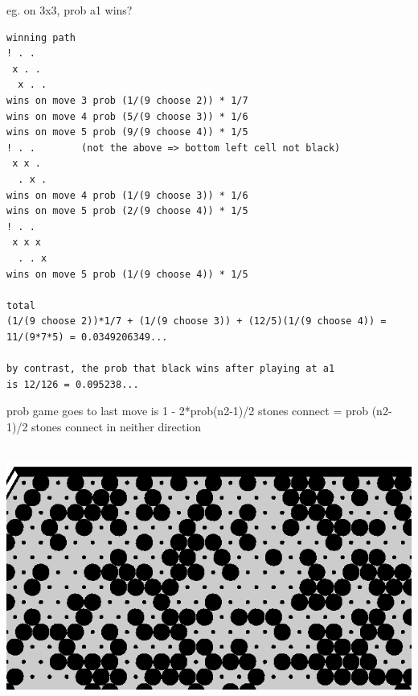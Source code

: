 \documentclass[12pt]{article}
\begin{document}
eg. on 3x3, prob a1 wins?
\begin{verbatim}
winning path
! . .        
 x . .
  x . .
wins on move 3 prob (1/(9 choose 2)) * 1/7
wins on move 4 prob (5/(9 choose 3)) * 1/6
wins on move 5 prob (9/(9 choose 4)) * 1/5
! . .        (not the above => bottom left cell not black)
 x x .
  . x .
wins on move 4 prob (1/(9 choose 3)) * 1/6
wins on move 5 prob (2/(9 choose 4)) * 1/5
! . .        
 x x x
  . . x
wins on move 5 prob (1/(9 choose 4)) * 1/5

total
(1/(9 choose 2))*1/7 + (1/(9 choose 3)) + (12/5)(1/(9 choose 4)) = 
11/(9*7*5) = 0.0349206349...

by contrast, the prob that black wins after playing at a1
is 12/126 = 0.095238...
\end{verbatim}

prob game goes to last move is 1 - 2*prob(n2-1)/2 stones connect
= prob (n2-1)/2 stones connect in neither direction

\newpage
\ \hfill \includegraphics[scale=1]{draw/bigboard.eps} \hfill \ 
\end{document}
